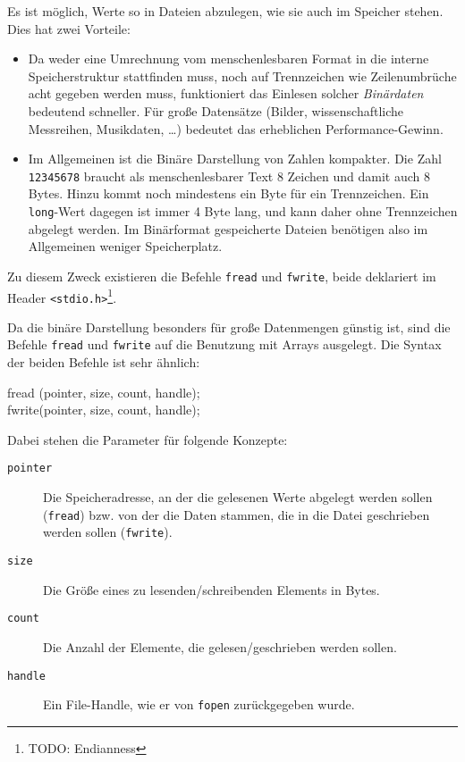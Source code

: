 Es ist möglich, Werte so in Dateien abzulegen, wie sie auch im Speicher stehen. Dies hat zwei Vorteile:
\begin{itemize}
\item Da weder eine Umrechnung vom menschenlesbaren Format in die interne Speicherstruktur stattfinden
		muss, noch auf Trennzeichen wie Zeilenumbrüche acht gegeben werden muss, funktioniert das
		Einlesen solcher \emph{Binärdaten} bedeutend schneller. Für große Datensätze (\eg Bilder,
		wissenschaftliche Messreihen, Musikdaten, \ldots) bedeutet das erheblichen Performance-Gewinn.
\item Im Allgemeinen ist die Binäre Darstellung von Zahlen kompakter. Die Zahl \texttt{12345678}
		braucht als menschenlesbarer Text 8 Zeichen und damit auch 8 Bytes. Hinzu kommt noch
		mindestens ein Byte für ein Trennzeichen. Ein \texttt{long}-Wert dagegen ist immer 4
		Byte lang, und kann daher ohne Trennzeichen abgelegt werden. Im Binärformat gespeicherte Dateien
		benötigen also im Allgemeinen weniger Speicherplatz.
\end{itemize}

Zu diesem Zweck existieren die Befehle \texttt{fread} und \texttt{fwrite}, beide deklariert im Header \texttt{<stdio.h>}\footnote{TODO: Endianness}.

Da die binäre Darstellung besonders für große Datenmengen günstig ist, sind die Befehle \texttt{fread} und \texttt{fwrite} auf die Benutzung mit Arrays ausgelegt. Die Syntax der beiden Befehle ist sehr ähnlich:
\begin{codebox}
fread (pointer, size, count, handle);\\
fwrite(pointer, size, count, handle);
\end{codebox}
Dabei stehen die Parameter für folgende Konzepte:
\begin{description}
\item[\texttt{pointer}] Die Speicheradresse, an der die gelesenen Werte abgelegt werden sollen
		(\texttt{fread}) bzw. von der die Daten stammen, die in die Datei geschrieben werden sollen
		(\texttt{fwrite}).
\item[\texttt{size}] Die Größe eines zu lesenden/schreibenden Elements in Bytes.
\item[\texttt{count}] Die Anzahl der Elemente, die gelesen/geschrieben werden sollen.
\item[\texttt{handle}] Ein File-Handle, wie er von \texttt{fopen} zurückgegeben wurde.
\end{description}

